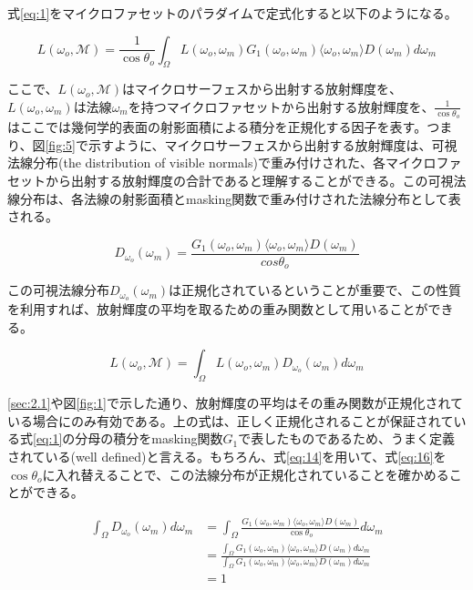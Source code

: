\documentclass[a4j,xelatex,ja=standard]{bxjsarticle}
\begin{document}
式\eqref{eq:1}をマイクロファセットのパラダイムで定式化すると以下のようになる。

\begin{equation}
    L(\omega_o, \mathcal{M}) = \frac{1}{\cos\theta_o} \int_\Omega L(\omega_o, \omega_m) G_1(\omega_o, \omega_m) \langle \omega_o, \omega_m \rangle D(\omega_m) d\omega_m
    \label{eq:15}
\end{equation}

ここで、$L(\omega_o, \mathcal{M})$はマイクロサーフェスから出射する放射輝度を、$L(\omega_o, \omega_m)$は法線$\omega_m$を持つマイクロファセットから出射する放射輝度を、$\frac{1}{\cos\theta_o}$はここでは幾何学的表面の射影面積による積分を正規化する因子を表す。つまり、図\ref{fig:5}で示すように、マイクロサーフェスから出射する放射輝度は、可視法線分布(the distribution of visible normals)で重み付けされた、各マイクロファセットから出射する放射輝度の合計であると理解することができる。この可視法線分布は、各法線の射影面積とmasking関数で重み付けされた法線分布として表される。

\begin{equation}
    D_{\omega_o}(\omega_m) = \frac{G_1(\omega_o, \omega_m) \langle \omega_o, \omega_m \rangle D(\omega_m)}{cos\theta_o}
    \label{eq:16}
\end{equation}

この可視法線分布$D_{\omega_o}(\omega_m)$は正規化されているということが重要で、この性質を利用すれば、放射輝度の平均を取るための重み関数として用いることができる。

\begin{equation}
    L(\omega_o, \mathcal{M}) = \int_\Omega L(\omega_o, \omega_m) D_{\omega_o}(\omega_m) d\omega_m
    \label{eq:17}
\end{equation}

\ref{sec:2.1}や図\ref{fig:1}で示した通り、放射輝度の平均はその重み関数が正規化されている場合にのみ有効である。上の式は、正しく正規化されることが保証されている式\eqref{eq:1}の分母の積分をmasking関数$G_1$で表したものであるため、うまく定義されている(well defined)と言える。もちろん、式\eqref{eq:14}を用いて、式\eqref{eq:16}を$\cos\theta_o$に入れ替えることで、この法線分布が正規化されていることを確かめることができる。

\begin{equation}
    \begin{split}
        \int_\Omega D_{\omega_o}(\omega_m) d\omega_m
        &= \int_\Omega \frac{G_1(\omega_o, \omega_m) \langle \omega_o, \omega_m \rangle D(\omega_m)}{\cos\theta_o} d\omega_m \\
        &= \frac{\int_\Omega G_1(\omega_o, \omega_m) \langle \omega_o, \omega_m \rangle D(\omega_m) d\omega_m}{\int_\Omega G_1(\omega_o, \omega_m) \langle \omega_o, \omega_m \rangle D(\omega_m)d \omega_m} \\
        &= 1
    \end{split}
    \label{eq:18}
\end{equation}
\end{document}
